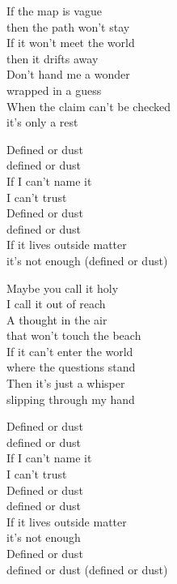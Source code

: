 \begin{lyrics}
If the map is vague\\
then the path won’t stay\\
If it won’t meet the world\\
then it drifts away\\
Don’t hand me a wonder\\
wrapped in a guess\\
When the claim can’t be checked\\
it’s only a rest

Defined or dust\\
defined or dust\\
If I can’t name it\\
I can’t trust\\
Defined or dust\\
defined or dust\\
If it lives outside matter\\
it’s not enough
(defined or dust)

Maybe you call it holy\\
I call it out of reach\\
A thought in the air\\
that won’t touch the beach\\
If it can’t enter the world\\
where the questions stand\\
Then it’s just a whisper\\
slipping through my hand

Defined or dust\\
defined or dust\\
If I can’t name it\\
I can’t trust\\
Defined or dust\\
defined or dust\\
If it lives outside matter\\
it’s not enough\\
Defined or dust\\
defined or dust
(defined or dust)
\end{lyrics}

